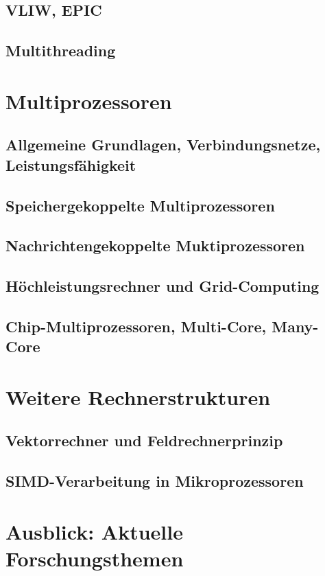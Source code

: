 \subsection{VLIW, EPIC}


\subsection{Multithreading}



\section{Multiprozessoren}

\subsection{Allgemeine Grundlagen, Verbindungsnetze, Leistungsfähigkeit}


\subsection{Speichergekoppelte Multiprozessoren}


\subsection{Nachrichtengekoppelte Muktiprozessoren}


\subsection{Höchleistungsrechner und Grid-Computing}


\subsection{Chip-Multiprozessoren, Multi-Core, Many-Core}



\section{Weitere Rechnerstrukturen}

\subsection{Vektorrechner und Feldrechnerprinzip}


\subsection{SIMD-Verarbeitung in Mikroprozessoren}



\section{Ausblick: Aktuelle Forschungsthemen}
